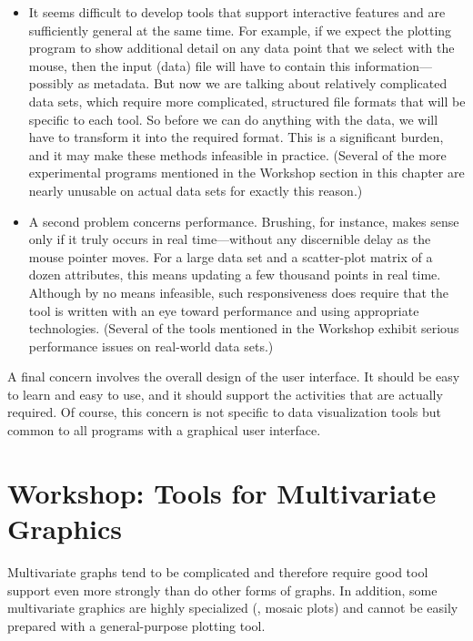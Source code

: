 \begin{itemize}
\item It seems difficult to develop tools that support interactive
  features and are sufficiently general at the same time. For example,
  if we expect the plotting program to show additional detail on any
  data point that we select with the mouse, then the input (data) file
  will have to contain this information---possibly as metadata.  But
  now we are talking about relatively complicated data sets, which
  require more complicated, structured file formats that will be
  specific to each tool. So before we can do anything with the data,
  we will have to transform it into the required format. This is a
  significant burden, and it may make these methods infeasible in
  practice.  (Several of the more experimental programs mentioned in
  the Workshop section in this chapter are nearly unusable on actual
  data sets for exactly this reason.)
\item A second problem concerns performance. Brushing, for instance,
  makes sense only if it truly occurs in real time---without any
  discernible delay as the mouse pointer moves. For a large data set
  and a scatter-plot matrix of a dozen attributes, this means updating
  a few thousand points in real time. Although by no means infeasible,
  such responsiveness does require that the tool is written with an
  eye toward performance and using appropriate technologies. (Several
  of the tools mentioned in the Workshop exhibit serious performance
  issues on real-world data sets.)
\end{itemize}

A final concern involves the overall design of the user interface. It
should be easy to learn and easy to use, and it should support the
activities that are actually required. Of course, this concern is not
specific to data visualization tools but common to all programs with
a graphical user interface.

\vspace*{-9pt}
\section{Workshop:  Tools for Multivariate Graphics}

Multivariate graphs tend to be complicated and therefore require good
tool support even more strongly than do other forms of graphs.  In
addition, some multivariate graphics are highly specialized (\eg,
mosaic plots) and cannot be easily prepared with a general-\break purpose
plotting tool.

